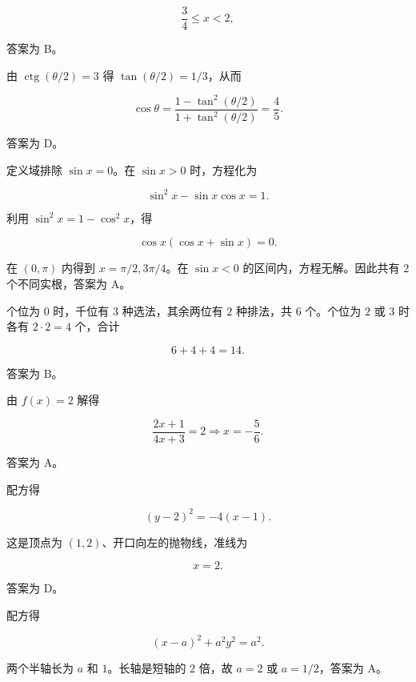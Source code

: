 \begin{answer}
\nopagebreak[4]
\[
\frac34\le x<2,
\]

答案为 B。


由 $\operatorname{ctg}(\theta/2)=3$ 得 $\tan(\theta/2)=1/3$，从而

\nopagebreak[4]
\[
\cos\theta=\frac{1-\tan^2(\theta/2)}{1+\tan^2(\theta/2)}
=\frac45.
\]

答案为 D。


定义域排除 $\sin x=0$。在 $\sin x>0$ 时，方程化为

\nopagebreak[4]
\[
\sin^2x-\sin x\cos x=1.
\]

利用 $\sin^2x=1-\cos^2x$，得

\nopagebreak[4]
\[
\cos x(\cos x+\sin x)=0.
\]

在 $(0,\pi)$ 内得到 $x=\pi/2,3\pi/4$。在 $\sin x<0$ 的区间内，方程无解。因此共有 $2$ 个不同实根，答案为 A。


个位为 $0$ 时，千位有 $3$ 种选法，其余两位有 $2$ 种排法，共 $6$ 个。个位为 $2$ 或 $3$ 时各有 $2\cdot2=4$ 个，合计

\nopagebreak[4]
\[
6+4+4=14.
\]

答案为 B。


由 $f(x)=2$ 解得

\nopagebreak[4]
\[
\frac{2x+1}{4x+3}=2
\Longrightarrow x=-\frac56.
\]

答案为 A。


配方得

\nopagebreak[4]
\[
(y-2)^2=-4(x-1).
\]

这是顶点为 $(1,2)$、开口向左的抛物线，准线为

\nopagebreak[4]
\[
x=2.
\]

答案为 D。


配方得

\nopagebreak[4]
\[
(x-a)^2+a^2y^2=a^2.
\]

两个半轴长为 $a$ 和 $1$。长轴是短轴的 $2$ 倍，故 $a=2$ 或 $a=1/2$，答案为 A。



\end{answer}
